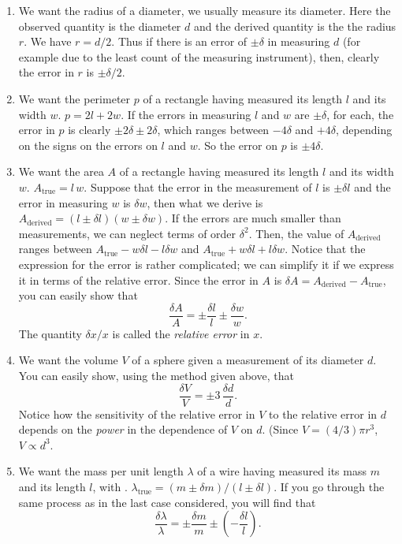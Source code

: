 \begin{enumerate}
    \item We want the radius of a diameter, we usually measure its diameter. Here the observed quantity is the diameter $d$ and the derived quantity is the the radius $r$. We have $r = d/2$. Thus if there is an error of $\pm \delta$ in measuring $d$ (for example due to the least count of the measuring instrument), then, clearly the error in $r$ is $\pm \delta/2$.
    
    \item We want the perimeter $p$ of a rectangle having measured its length $l$ and its width $w$. $p = 2l + 2w$. If the errors in measuring $l$ and $w$ are $\pm \delta$, for each, the error in $p$ is clearly $\pm 2 \delta \pm 2 \delta$, which ranges between $- 4 \delta$ and $+ 4\delta $, depending on the signs on the errors on $l$ and $w$. So the error on $p$ is $\pm 4 \delta$.
    
    \item We want the area $A$ of a rectangle having measured its length $l$ and its width $w$. $A_\text{true} = l \, w$. Suppose that the error in the measurement of $l$ is $\pm \delta l$ and the error in measuring $w$ is $\delta w$, then what we derive is $A_\text{derived} = (l \pm \delta l) (w \pm \delta w)$. If the errors are much smaller than measurements, we can neglect terms of order $\delta^2$. Then, the value of $A_\text{derived}$ ranges between $A_\text{true} - w \delta l - l \delta w$ and $A_\text{true} +  w \delta l + l \delta w$. Notice that the expression for the error is rather complicated; we can simplify it if we express it in terms of the relative error. Since the error in $A$ is $\delta A = A_\text{derived} - A_\text{true}$, you can easily show that 
    \begin{equation*}
        \frac{\delta A}{A} = \pm \frac{\delta l}{l} \pm \frac{\delta w}{w}.
    \end{equation*}
    The quantity $\delta x / x$ is called the \textit{relative error} in $x$.
    
    \item We want the volume $V$ of a sphere given a measurement of its diameter $d$. You can easily show, using the method given above, that 
\begin{equation*}
    \frac{\delta V}{V} = \pm 3 \, \frac{\delta d}{d}.
\end{equation*}
Notice how the sensitivity of the relative error in $V$ to the relative error in $d$ depends on the \textit{power} in the dependence of $V$ on $d$. (Since $V = (4/3) \pi r^3$, $V \propto d^3$.
    
    \item We want the mass per unit length $\lambda$ of a wire having measured its mass $m$ and its length $l$, with . $\lambda_\text{true} = (m \pm \delta m) / (l \pm \delta l)$. If you go through the same process as in the last case considered, you will find that 
    \begin{equation*}
        \frac{\delta \lambda}{\lambda} = \pm \frac{\delta m}{m} \pm \left( -\frac{\delta l}{l} \right).
    \end{equation*}
    
\end{enumerate}

